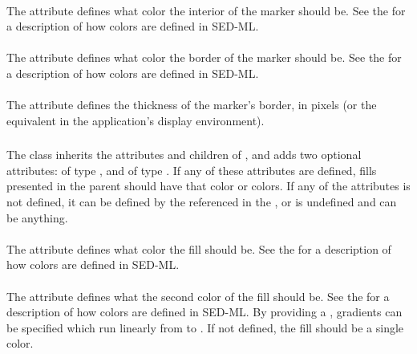 \begin{blockChanged}
\paragraph*{}

The  attribute defines what color the interior of the marker should be.  See the \SedColor for a description of how colors are defined in SED-ML.

\paragraph*{}

The  attribute defines what color the border of the marker should be.  See the \SedColor for a description of how colors are defined in SED-ML.

\paragraph*{}

The  attribute defines the thickness of the marker's border, in pixels (or the equivalent in the application's display environment).



\subsubsection{}
\label{class:fill}

The \Fill class inherits the attributes and children of \SedBase, and adds two optional attributes:  of type \SedColor, and  of type \SedColor.  If any of these attributes are defined, fills presented in the parent \Style should have that color or colors.  If any of the attributes is not defined, it can be defined by the \Style referenced in the , or is undefined and can be anything.

\paragraph*{}

The  attribute defines what color the fill should be.  See the \SedColor for a description of how colors are defined in SED-ML.

\paragraph*{}

The  attribute defines what the second color of the fill should be.  See the \SedColor for a description of how colors are defined in SED-ML.  By providing a , gradients can be specified which run linearly from  to .  If not defined, the fill should be a single color.




\end{blockChanged}
